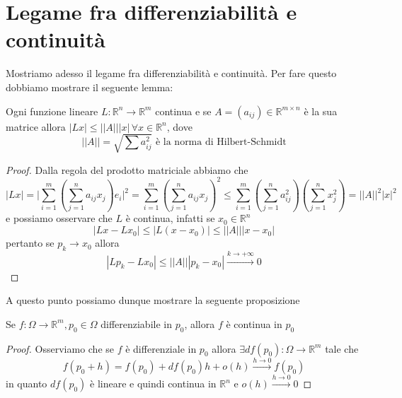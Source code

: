 \section{Legame fra differenziabilità e continuità}
Mostriamo adesso il legame fra differenziabilità e continuità. Per fare questo dobbiamo mostrare il seguente lemma:
\begin{lemma}
Ogni funzione lineare $L: \mathbb{R}^n \to \mathbb{R}^m$ continua e se $A = (a_{ij}) \in \mathbb{R}^{m \times n}$ è la sua matrice allora $|Lx| \leq || A || |x|  \, \forall x \in \mathbb{R}^n$, dove
$$
|| A || = \sqrt{\sum a_{ij}^2} \text{ è la norma di Hilbert-Schmidt}
$$
\end{lemma}
\begin{proof}
Dalla regola del prodotto matriciale abbiamo che
$$
|Lx| = \Bigg| \sum_{i=1}^m \left( \sum_{j=1}^n a_{ij} x_j \right)e_i \Bigg|^2 = \sum_{i=1}^m \left( \sum_{j=1}^n a_{ij} x_j \right)^2 \leq \sum_{i=1}^m \left( \sum_{j=1}^n a_{ij}^2 \right)  \left( \sum_{j=1}^n x_j^2 \right) = || A ||^2 |x|^2
$$
e possiamo osservare che $L$ è continua, infatti se $x_0 \in \mathbb{R}^n$
$$
|Lx - Lx_0| \leq |L(x-x_0)| \leq || A || |x-x_0|
$$
pertanto se $p_k \to x_0$ allora
$$
|Lp_k - Lx_0| \leq || A || |p_k-x_0| \stackrel{k \to +\infty}{\to} 0
$$
\end{proof}
A questo punto possiamo dunque mostrare la seguente proposizione
\begin{prop}
Se $f: \Omega \to \mathbb{R}^m, p_0 \in \Omega$ differenziabile in $p_0$, allora $f$ è continua in $p_0$
\end{prop}
\begin{proof}
Osserviamo che se $f$ è differenziale in $p_0$ allora $\exists df(p_0): \Omega \to \mathbb{R}^m$ tale che
$$
f(p_0 + h) = f(p_0) + df(p_0)h + o(h) \stackrel{h \to 0}{\to} f(p_0)
$$
in quanto $df(p_0)$ è lineare e quindi continua in $\mathbb{R}^n$ e $o(h) \stackrel{h \to 0}{\to} 0$
\end{proof}
